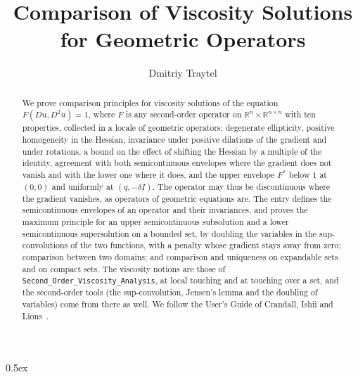 \documentclass[11pt,a4paper]{article}
\begin{document}
\title{Comparison of Viscosity Solutions for Geometric Operators}
\author{Dmitriy Traytel}
\maketitle

\begin{abstract}
  We prove comparison principles for viscosity solutions of the equation
  $F(Du, D^2u) = 1$, where $F$ is any second-order operator on
  $\mathbb{R}^n \times \mathbb{R}^{n \times n}$ with ten properties,
  collected in a locale of geometric operators: degenerate ellipticity,
  positive homogeneity in the Hessian, invariance under positive dilations
  of the gradient and under rotations, a bound on the effect of shifting
  the Hessian by a multiple of the identity, agreement with both
  semicontinuous envelopes where the gradient does not vanish and with the
  lower one where it does, and the upper envelope $F^*$ below $1$ at
  $(0, 0)$ and uniformly at $(q, -\delta I)$.  The operator may thus be
  discontinuous where the gradient vanishes, as operators of geometric
  equations are.  The entry defines the semicontinuous envelopes of an
  operator and their invariances, and proves the maximum principle for an
  upper semicontinuous subsolution and a lower semicontinuous
  supersolution on a bounded set, by doubling the variables in the
  sup-convolutions of the two functions, with a penalty whose gradient
  stays away from zero; comparison between two domains; and comparison
  and uniqueness on expandable sets and on compact sets.  The viscosity
  notions are those of \texttt{Second\_Order\_Viscosity\_Analysis}, at
  local touching and at touching over a set, and the second-order tools
  (the sup-convolution, Jensen's lemma and the doubling of variables) come
  from there as well.  We follow the User's Guide of
  Crandall, Ishii and Lions~\cite{CrandallIshiiLions}.
\end{abstract}

\tableofcontents

\parindent 0pt\parskip 0.5ex





\end{document}
